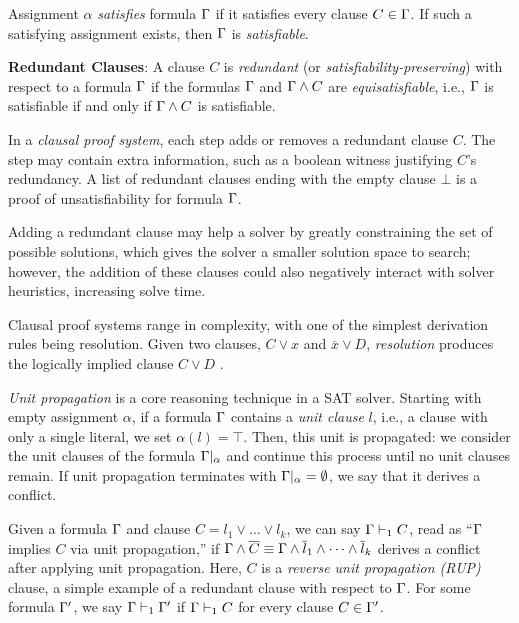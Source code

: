 Assignment $\alpha$ \emph{satisfies} formula $\Gamma$ if it satisfies every
clause $C \in \Gamma$. If such a satisfying assignment exists, then $\Gamma$
is \emph{satisfiable}.

\textbf{Redundant Clauses}: A clause $C$ is \emph{redundant} (or
\emph{satisfiability-preserving}) with respect to a formula $\Gamma$ if the
formulas $\Gamma$ and $\Gamma \land C$ are \emph{equisatisfiable}, i.e.,
$\Gamma$ is satisfiable if and only if $\Gamma \land C$ is satisfiable.

In a \emph{clausal proof system}, each step adds or removes a redundant clause
$C$. The step may contain extra information, such as a boolean witness
justifying $C$'s redundancy. A list of redundant clauses ending with the empty
clause $\bot$ is a proof of unsatisfiability for formula $\Gamma$.

Adding a redundant clause may help a solver by greatly constraining the set of
possible solutions, which gives the solver a smaller solution space to search;
however, the addition of these clauses could also negatively interact with
solver heuristics, increasing solve time.

Clausal proof systems range in complexity, with one of the simplest derivation
rules being resolution. Given two clauses, $C \lor x$ and $\overline{x} \lor D$,
\emph{resolution} produces the logically implied clause  $C \lor D$ .


\emph{Unit propagation} is a core reasoning technique in a SAT solver. Starting
with empty assignment $\alpha$, if a formula $\Gamma$ contains a \emph{unit
clause} $l$, i.e., a clause with only a single literal, we set $\alpha(l) =
\top$. Then, this unit is propagated: we consider the unit clauses of the
formula $\Gamma|_\alpha$ and continue this process until no unit clauses
remain. If unit propagation terminates with $\Gamma|_\alpha = \emptyset$, we
say that it derives a conflict.


Given a formula $\Gamma$ and clause $C = l_1 \lor \dots \lor l_k$, we can say
$\Gamma \vdash_1 C$, read as ``$\Gamma$ implies $C$ via unit propagation,''
if $\Gamma \land \overline{C} \equiv \Gamma \land \overline{l}_1 \land \dots
\land \overline{l}_k$ derives a conflict after applying unit propagation. Here,
$C$ is a \emph{reverse unit propagation (RUP)} clause, a simple example of a
redundant clause with respect to $\Gamma$. For some formula $\Gamma'$, we
say $\Gamma \vdash_1 \Gamma'$ if $\Gamma \vdash_1 C$ for every clause $C
\in \Gamma'$.

